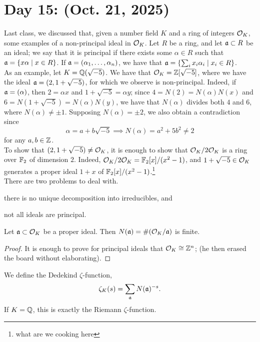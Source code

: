 \section{Day 15: (Oct. 21, 2025)}
Last class, we discussed that, given a number field $K$ and a ring of integers $\mathcal O_K$, some examples of a non-principal ideal in $\mathcal O_K$. Let $R$ be a ring, and let $\mathfrak a \subset R$ be an ideal; we say that it is principal if there exists some $\alpha \in R$ such that $\mathfrak a = \{x\alpha \mid x \in R\}$. If $\mathfrak a = (\alpha_1, \dots, \alpha_n)$, we have that $\mathfrak a = \{\sum_i x_i \alpha_i \mid x_i \in R\}$.
\\[8pt]
As an example, let $K = \mathbb Q(\sqrt{-5})$. We have that $\mathcal O_K = \mathbb Z[\sqrt{-5}]$, where we have the ideal $\mathfrak a = (2, 1 + \sqrt{-5})$, for which we observe is non-principal. Indeed, if $\mathfrak a = (\alpha)$, then $2 = \alpha x$ and $1 + \sqrt{-5} = \alpha y$; since $4 = N(2) = N(\alpha)N(x)$ and $6 = N(1 + \sqrt{-5}) = N(\alpha)N(y)$, we have that $N(\alpha)$ divides both $4$ and $6$, where $N(\alpha) \neq \pm 1$. Supposing $N(\alpha) = \pm 2$, we also obtain a contradiction since
\[ \alpha = a + b \sqrt{-5} \implies N(\alpha) = a^2 + 5b^2 \neq 2 \]
for any $a, b \in \mathbb Z$.
\\[8pt]
To show that $(2, 1 + \sqrt{-5}) \neq \mathcal O_K$, it is enough to show that $\mathcal O_K / 2 \mathcal O_K$ is a ring over $\mathbb F_2$ of dimension $2$. Indeed, $\mathcal O_K / 2 \mathcal O_K = \mathbb F_2[x] / (x^2 - 1)$, and $1 + \sqrt{-5} \in \mathcal O_K$ generates a proper ideal $1 + x$ of $\mathbb F_2[x] / (x^2 - 1)$.\footnote{what are we cooking here}
\\[8pt]
There are two problems to deal with. \begin{parlist} \item there is no unique decomposition into irreducibles, and \item not all ideals are principal. \end{parlist}
\begin{lemma}
    Let $\mathfrak a \subset \mathcal O_K$ be a proper ideal. Then $N(\mathfrak a) = \# (\mathcal O_K / \mathfrak a)$ is finite.
\end{lemma}
\begin{proof}
    It is enough to prove for principal ideals that $\mathcal O_K \cong \mathbb Z^n$; (he then erased the board without elaborating).
\end{proof}
\begin{definition}
    We define the Dedekind $\zeta$-function,
    \[ \zeta_K(s) = \sum_{\mathfrak a} N(\mathfrak a)^{-s}. \]
    If $K = \mathbb Q$, this is exactly the Riemann $\zeta$-function.
\end{definition}
